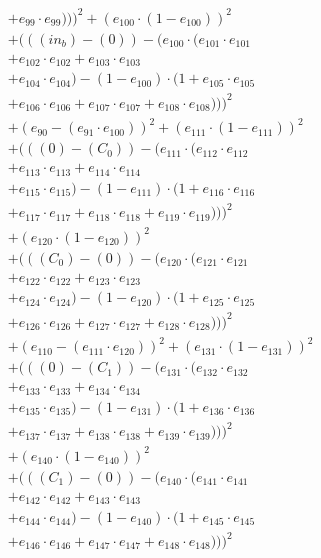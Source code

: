 \documentclass[10pt, a4paper]{article}
\begin{document}
\begin{small}
\begin{align*}
& + e_{99} \cdot e_{99})))^{2} + (e_{100} \cdot (1 - e_{100}))^{2} \\
& + (((in_b) - (0)) - (e_{100} \cdot (e_{101} \cdot e_{101} \\
& + e_{102} \cdot e_{102} + e_{103} \cdot e_{103} \\
& + e_{104} \cdot e_{104}) - (1 - e_{100}) \cdot (1 + e_{105} \cdot e_{105} \\
& + e_{106} \cdot e_{106} + e_{107} \cdot e_{107} + e_{108} \cdot e_{108})))^{2} \\
& + (e_{90} - (e_{91} \cdot e_{100}))^{2} + (e_{111} \cdot (1 - e_{111}))^{2} \\
& + (((0) - (C_{0})) - (e_{111} \cdot (e_{112} \cdot e_{112} \\
& + e_{113} \cdot e_{113} + e_{114} \cdot e_{114} \\
& + e_{115} \cdot e_{115}) - (1 - e_{111}) \cdot (1 + e_{116} \cdot e_{116} \\
& + e_{117} \cdot e_{117} + e_{118} \cdot e_{118} + e_{119} \cdot e_{119})))^{2} \\
& + (e_{120} \cdot (1 - e_{120}))^{2} \\
& + (((C_{0}) - (0)) - (e_{120} \cdot (e_{121} \cdot e_{121} \\
& + e_{122} \cdot e_{122} + e_{123} \cdot e_{123} \\
& + e_{124} \cdot e_{124}) - (1 - e_{120}) \cdot (1 + e_{125} \cdot e_{125} \\
& + e_{126} \cdot e_{126} + e_{127} \cdot e_{127} + e_{128} \cdot e_{128})))^{2} \\
& + (e_{110} - (e_{111} \cdot e_{120}))^{2} + (e_{131} \cdot (1 - e_{131}))^{2} \\
& + (((0) - (C_{1})) - (e_{131} \cdot (e_{132} \cdot e_{132} \\
& + e_{133} \cdot e_{133} + e_{134} \cdot e_{134} \\
& + e_{135} \cdot e_{135}) - (1 - e_{131}) \cdot (1 + e_{136} \cdot e_{136} \\
& + e_{137} \cdot e_{137} + e_{138} \cdot e_{138} + e_{139} \cdot e_{139})))^{2} \\
& + (e_{140} \cdot (1 - e_{140}))^{2} \\
& + (((C_{1}) - (0)) - (e_{140} \cdot (e_{141} \cdot e_{141} \\
& + e_{142} \cdot e_{142} + e_{143} \cdot e_{143} \\
& + e_{144} \cdot e_{144}) - (1 - e_{140}) \cdot (1 + e_{145} \cdot e_{145} \\
& + e_{146} \cdot e_{146} + e_{147} \cdot e_{147} + e_{148} \cdot e_{148})))^{2} \\

\end{align*}
\end{small}
\end{document}
